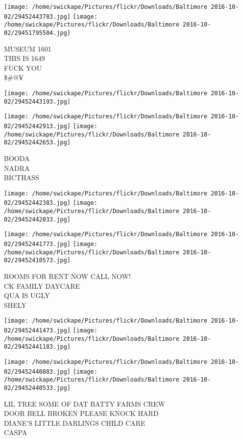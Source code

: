 \documentclass[10pt,letterpaper]{article}
\begin{document}
\texttt{[image: /home/swickape/Pictures/flickr/Downloads/Baltimore 2016-10-02/29452443783.jpg]}
\texttt{[image: /home/swickape/Pictures/flickr/Downloads/Baltimore 2016-10-02/29451795504.jpg]}

MUSEUM 1601\\
THIS IS 1649\\
FUCK YOU\\
\$\#@¥
\pagebreak

\texttt{[image: /home/swickape/Pictures/flickr/Downloads/Baltimore 2016-10-02/29452443193.jpg]}

\vspace{0.25in}
\texttt{[image: /home/swickape/Pictures/flickr/Downloads/Baltimore 2016-10-02/29452442913.jpg]}
\texttt{[image: /home/swickape/Pictures/flickr/Downloads/Baltimore 2016-10-02/29452442653.jpg]}

BOODA\\
NADRA\\
BICTHASS
\pagebreak

\texttt{[image: /home/swickape/Pictures/flickr/Downloads/Baltimore 2016-10-02/29452442383.jpg]}
\texttt{[image: /home/swickape/Pictures/flickr/Downloads/Baltimore 2016-10-02/29452442033.jpg]}

\texttt{[image: /home/swickape/Pictures/flickr/Downloads/Baltimore 2016-10-02/29452441773.jpg]}
\texttt{[image: /home/swickape/Pictures/flickr/Downloads/Baltimore 2016-10-02/29452410573.jpg]}

ROOMS FOR RENT NOW CALL NOW!\\
CK FAMILY DAYCARE\\
QUA IS UGLY\\
SHELY
\pagebreak

\texttt{[image: /home/swickape/Pictures/flickr/Downloads/Baltimore 2016-10-02/29452441473.jpg]}
\texttt{[image: /home/swickape/Pictures/flickr/Downloads/Baltimore 2016-10-02/29452441183.jpg]}

\texttt{[image: /home/swickape/Pictures/flickr/Downloads/Baltimore 2016-10-02/29452440883.jpg]}
\texttt{[image: /home/swickape/Pictures/flickr/Downloads/Baltimore 2016-10-02/29452440533.jpg]}

LIL TREE SOME OF DAT BATTY FARMS CREW\\
DOOR BELL BROKEN PLEASE KNOCK HARD\\
DIANE'S LITTLE DARLINGS CHILD CARE\\
CASPA
\pagebreak
\end{document}
